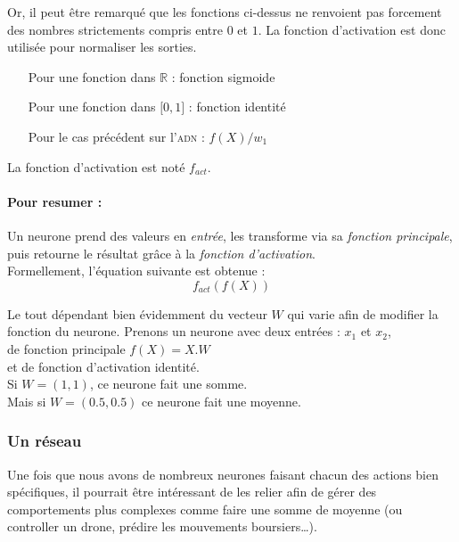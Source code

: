 Or, il peut être remarqué que les fonctions ci-dessus ne renvoient pas
forcement des nombres strictements compris entre $0$ et $1$.
La fonction d'activation est donc utilisée pour normaliser les sorties.
\exemle
{
\begin{itemize}
    \item[Pour une fonction dans $\mathbb{R}$ :] fonction sigmoide
    \item[Pour une fonction dans $[0, 1 \rbrack$ :] fonction identité
    \item[Pour le cas précédent sur l'\textsc{adn} :] $f(X)/w_1$
\end{itemize}
}
La fonction d'activation est noté $f_{act}$.


\paragraph{Pour resumer :}
Un neurone prend des valeurs en \textit{entrée},
les transforme via sa \textit{fonction principale},
puis retourne le résultat grâce à la \textit{fonction d'activation}. \\
Formellement, l'équation suivante est obtenue :
\begin{equation}
    f_{act}(f(X))
\end{equation}


Le tout dépendant bien évidemment du vecteur $W$ qui varie afin de modifier la fonction du neurone.
\exemle
{
Prenons un neurone avec deux entrées : $x_1$ et $x_2$, \\
de fonction principale $f(X) = X.W$ \\
et de fonction d'activation identité. \\
Si $W = (1, 1)$, ce neurone fait une somme.\\
Mais si $W = (0.5, 0.5)$ ce neurone fait une moyenne.
}


\subsubsection{Un réseau}
Une fois que nous avons de nombreux neurones faisant chacun des actions bien spécifiques,
il pourrait être intéressant de les relier afin de gérer des comportements plus complexes
comme faire une somme de moyenne (ou controller un drone, prédire les mouvements boursiers\ldots).

